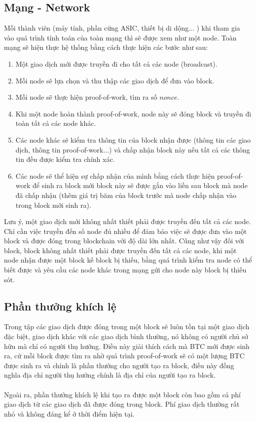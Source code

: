 \subsection{Mạng - Network}
Mỗi thành viên (máy tính, phần cứng ASIC, thiết bị di dộng... ) khi tham gia vào quá 
trình tính toán của toàn mạng thì sẽ được xem như một node. Toàn mạng sẽ hiện thực hệ 
thống bằng cách thực hiện các bước như sau:
\begin{enumerate}
\item Một giao dịch mới được truyền đi cho tất cả các node (broadcast).
\item Mỗi node sẽ lựa chọn và thu thập các giao dịch để đưa vào block.
\item Mỗi node sẽ thực hiện proof-of-work, tìm ra số $nonce$.
\item Khi một node hoàn thành proof-of-work, node này sẽ đóng block và truyền 
đi toàn tất cả các node khác.
\item Các node khác sẽ kiểm tra thông tin của block nhận được (thông tin các 
giao dịch, thông tin proof-of-work...) và chấp nhận block này nếu tất cả 
các thông tin đều được kiểm tra chính xác.
\item Các node sẽ thể hiện sự chấp nhận của mình bằng cách thực hiện proof-of-work 
để sinh ra block mới block này sẽ được gắn vào liền sau block mà node đã chấp nhận 
(thêm giá trị băm của block trước mà node chấp nhận vào trong block mới sinh ra).
\end{enumerate}
Lưu ý, một giao dịch mới không nhất thiết phải được truyền đến tất cả các node. 
Chỉ cần việc truyền đến số node đủ nhiều để đảm bảo việc sẽ được đưa vào một block 
và được đóng trong blockchain với độ dài lớn nhất. Cũng như vậy đối với block, 
block không nhất thiết phải được truyền đến tất cả các node, khi một node nhận 
được một block kế block bị thiếu, bằng quá trình kiểm tra node có thể biết được 
và yêu cầu các node khác trong mạng gửi cho node này block bị thiếu sót.
\subsection{Phần thưởng khích lệ}
Trong tập các giao dịch được đóng trong một block sẽ luôn tồn tại một giao dịch 
đặc biệt, giao dịch khác với các giao dịch bình thường, nó không có người chủ 
sở hữu mà chỉ có người thụ hưởng. Điều này giải thích cách mà BTC mới được sinh 
ra, cứ mỗi block được tìm ra nhờ quá trình proof-of-work sẽ có một lượng BTC 
được sinh ra và chính là phần thưởng cho người tạo ra block, điều này đồng nghĩa 
địa chỉ người thụ hưởng chính là địa chỉ của người tạo ra block.\\\\
Ngoài ra, phần thưởng khích lệ khi tạo ra được một block còn bao gồm cả phí giao 
dịch từ các giao dịch đã được đóng trong block. Phí giao dịch thường rất nhỏ và
không đáng kể ở thời điểm hiện tại.
